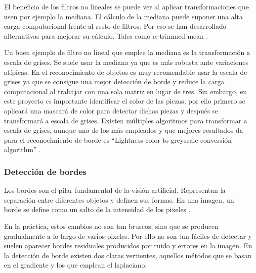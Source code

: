 \begin{itemize}
El beneficio de los filtros no lineales se puede ver al aplicar transformaciones que usen por ejemplo la mediana. El cálculo de la mediana puede suponer una alta carga computacional frente al resto de filtros. Por eso se han desarrollado alternativas para mejorar su cálculo. Tales como $\alpha$-trimmed mean \cite{alfa}.

Un buen ejemplo de filtro no lineal que emplee la mediana es la transformación a escala de grises. Se suele usar la mediana ya que es más robusta ante variaciones atípicas. En el reconocimiento de objetos es muy recomendable usar la escala de grises ya que se consigue una mejor detección de borde \cite{greyscale} y reduce la carga computacional al trabajar con una sola matriz en lugar de tres. Sin embargo, en este proyecto es importante identificar el color de las piezas, por ello primero se aplicará una mascará de color para detectar dichas piezas y después se transformará a escala de grises. Existen múltiples algoritmos para transformar a escala de grises, aunque uno de los más empleados y que mejores resultados da para el reconocimiento de borde es “Lightness color-to-greyscale conversión algorithm” \cite{greyscale}.
\end{itemize}


\subsubsection*{Detección de bordes}
Los bordes son el pilar fundamental de la visión artificial. Representan la separación entre diferentes objetos y definen sus formas. En una imagen, un borde se define como un salto de la intensidad de los pixeles \cite{TFGAna}.

En la práctica, estos cambios no son tan bruscos, sino que se producen gradualmente a lo largo de varios pixeles. Por ello no son tan fáciles de detectar y suelen aparecer bordes residuales producidos por ruido y errores en la imagen. En la detección de borde existen dos claras vertientes, aquellos métodos que se basan en el gradiente y los que emplean el laplaciano.


